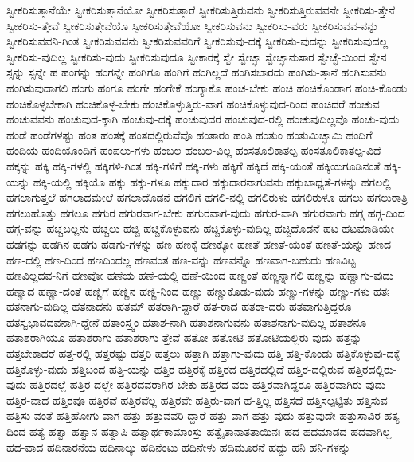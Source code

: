 {ಸ್ವೀಕರಿಸುತ್ತಾನೆಯೇ
ಸ್ವೀಕರಿಸುತ್ತಾನೆಯೋ
ಸ್ವೀಕರಿಸುತ್ತಾರೆ
ಸ್ವೀಕರಿಸುತ್ತಿರುವನು
ಸ್ವೀಕರಿಸುತ್ತಿರುವವನೇ
ಸ್ವೀಕರಿಸು-ತ್ತೇನೆ
ಸ್ವೀಕರಿಸು-ತ್ತೇವೆ
ಸ್ವೀಕರಿಸುತ್ತೇವೆಯೊ
ಸ್ವೀಕರಿಸುತ್ತೇವೆಯೋ
ಸ್ವೀಕರಿಸುವನು
ಸ್ವೀಕರಿಸು-ವರು
ಸ್ವೀಕರಿಸುವವ-ನನ್ನು
ಸ್ವೀಕರಿಸುವವನಿ-ಗಿಂತ
ಸ್ವೀಕರಿಸುವವನು
ಸ್ವೀಕರಿಸುವವರಿಗೆ
ಸ್ವೀಕರಿಸುವು-ದಕ್ಕೆ
ಸ್ವೀಕರಿಸು-ವುದನ್ನು
ಸ್ವೀಕರಿಸುವುದಲ್ಲ
ಸ್ವೀಕರಿಸು-ವುದಿಲ್ಲ
ಸ್ವೀಕರಿಸು-ವುದು
ಸ್ವೀಕರಿಸುವುದೂ
ಸ್ವೀಕಾರಕ್ಕೆ
ಸ್ವೇ
ಸ್ವೇಚ್ಛಾ
ಸ್ವೇಚ್ಛಾನುಸಾರ
ಸ್ವೇಚ್ಛೆ-ಯಿಂದ
ಸ್ವೇನ
ಸ್ಸನ್ನು
ಸ್ಸನ್ನೇ
ಹ
ಹಂಗನ್ನು
ಹಂಗನ್ನೇ
ಹಂಗಿಗೂ
ಹಂಗಿಗೆ
ಹಂಗಿಲ್ಲದೆ
ಹಂಗಿಸಬಾರದು
ಹಂಗಿಸು-ತ್ತಾನೆ
ಹಂಗಿಸುವನು
ಹಂಗಿಸುವುದಾಗಲಿ
ಹಂಗು
ಹಂಗೂ
ಹಂಗೇ
ಹಂಗೇಕೆ
ಹಂಗ್ಯಾಕೊ
ಹಂಚ-ಬೇಕು
ಹಂಚಿ
ಹಂಚಿಕೊಂಡಾಗ
ಹಂಚಿ-ಕೊಂಡು
ಹಂಚಿಕೊಳ್ಳಬೇಕಾಗಿ
ಹಂಚಿಕೊಳ್ಳ-ಬೇಕು
ಹಂಚಿಕೊಳ್ಳುತ್ತಿರು-ವಾಗ
ಹಂಚಿಕೊಳ್ಳುವುದ-ರಿಂದ
ಹಂಚಿದರೆ
ಹಂಚುವ
ಹಂಚುವವನು
ಹಂಚುವುದ-ಕ್ಕಾಗಿ
ಹಂಚುವು-ದಕ್ಕೆ
ಹಂಚುವುದರ
ಹಂಚುವುದ-ರಲ್ಲಿ
ಹಂಚುವುದಿಲ್ಲವೊ
ಹಂಚು-ವುದು
ಹಂಡೆ
ಹಂಡೆಗಳಷ್ಟು
ಹಂತ
ಹಂತಕ್ಕೆ
ಹಂತದಲ್ಲಿರುವೆವೊ
ಹಂತಾರಂ
ಹಂತಿ
ಹಂತುಂ
ಹಂತುಮಿಚ್ಛಾಮಿ
ಹಂದಿಗೆ
ಹಂದಿಯ
ಹಂದಿಯೊಂದಿಗೆ
ಹಂಪಲು-ಗಳು
ಹಂಬಲ
ಹಂಬಲ-ವಿಲ್ಲ
ಹಂಸತೂಲಿಕಾತಲ್ಪ
ಹಂಸತೂಲಿಕಾತಲ್ಪ-ವಿದೆ
ಹಕ್ಕನ್ನು
ಹಕ್ಕಿ
ಹಕ್ಕಿ-ಗಳಲ್ಲಿ
ಹಕ್ಕಿಗಳಿ-ಗಿಂತ
ಹಕ್ಕಿ-ಗಳಿಗೆ
ಹಕ್ಕಿ-ಗಳು
ಹಕ್ಕಿಗೆ
ಹಕ್ಕಿದೆ
ಹಕ್ಕಿ-ಯಂತೆ
ಹಕ್ಕಿಯಗೂಡಿನಂತೆ
ಹಕ್ಕಿ-ಯನ್ನು
ಹಕ್ಕಿ-ಯಲ್ಲಿ
ಹಕ್ಕಿಯೊ
ಹಕ್ಕು
ಹಕ್ಕು-ಗಳೂ
ಹಕ್ಕುದಾರ
ಹಕ್ಕುದಾರನಾಗುವನು
ಹಕ್ಕುಬಾಧ್ಯತೆ-ಗಳನ್ನು
ಹಗಲಲ್ಲಿ
ಹಗಲಾಗುತ್ತಲೆ
ಹಗಲಾದಮೇಲೆ
ಹಗಲಾದೊಡನೆ
ಹಗಲಿಗೆ
ಹಗಲಿ-ನಲ್ಲಿ
ಹಗಲಿರುಳು
ಹಗಲಿರುಳೂ
ಹಗಲು
ಹಗಲುರಾತ್ರಿ
ಹಗಲುಹೊತ್ತು
ಹಗಲೂ
ಹಗುರ
ಹಗುರವಾಗ-ಬೇಕು
ಹಗುರವಾಗ-ವುದು
ಹಗುರ-ವಾಗಿ
ಹಗುರವಾಗು
ಹಗ್ಗ
ಹಗ್ಗ-ದಿಂದ
ಹಗ್ಗ-ವನ್ನು
ಹಚ್ಚಬಲ್ಲನು
ಹಚ್ಚಲು
ಹಚ್ಚಿ
ಹಚ್ಚಿಕೊಳ್ಳುವನು
ಹಚ್ಚಿಕೊಳ್ಳು-ವುದಿಲ್ಲ
ಹಚ್ಚಿದೊಡನೆ
ಹಟ
ಹಟಮಾಡಿಯೇ
ಹಡಗನ್ನು
ಹಡಗಿನ
ಹಡಗು
ಹಡಗು-ಗಳನ್ನು
ಹಣ
ಹಣಕ್ಕೆ
ಹಣಕ್ಕೋ
ಹಣತೆ
ಹಣತೆ-ಯಂತೆ
ಹಣತೆ-ಯನ್ನು
ಹಣದ
ಹಣ-ದಲ್ಲಿ
ಹಣ-ದಿಂದ
ಹಣದಿಂದಲ್ಲ
ಹಣವಂತ
ಹಣ-ವನ್ನು
ಹಣವನ್ನೊ
ಹಣವಾಗ-ಬಹುದು
ಹಣವಿಟ್ಟ
ಹಣವಿಲ್ಲದವ-ನಿಗೆ
ಹಣವೋ
ಹಣೆಯ
ಹಣೆ-ಯಲ್ಲಿ
ಹಣೆ-ಯಿಂದ
ಹಣ್ಣಂತೆ
ಹಣ್ಣನ್ನಾಗಲಿ
ಹಣ್ಣನ್ನು
ಹಣ್ಣಾಗು-ವುದು
ಹಣ್ಣಾದ
ಹಣ್ಣಾ-ದಂತೆ
ಹಣ್ಣಿಗೆ
ಹಣ್ಣಿನ
ಹಣ್ಣಿ-ನಿಂದ
ಹಣ್ಣು
ಹಣ್ಣುಕೊಡು-ವುದು
ಹಣ್ಣು-ಗಳನ್ನು
ಹಣ್ಣು-ಗಳು
ಹತಃ
ಹತನಾಗು-ವುದಿಲ್ಲ
ಹತನಾದನು
ಹತಮ್
ಹತರಾಗಿ-ದ್ದಾರೆ
ಹತ-ರಾದ
ಹತರಾ-ದರು
ಹತವಾಗುತ್ತಿದ್ದರೂ
ಹತಸ್ವಭಾವದವನಾಗಿ-ದ್ದೇನೆ
ಹತಾಂಸ್ತ್ವಂ
ಹತಾಶ-ನಾಗಿ
ಹತಾಶನಾಗುವನು
ಹತಾಶನಾಗು-ವುದಿಲ್ಲ
ಹತಾಶನೂ
ಹತಾಶರಾಗಿಯೂ
ಹತಾಶರಾಗು
ಹತಾಶರಾಗು-ತ್ತೇವೆ
ಹತೋ
ಹತೋಟಿ
ಹತೋಟಿಯಲ್ಲಿರು-ವುದು
ಹತ್ತನ್ನು
ಹತ್ತಬೇಕಾದರೆ
ಹತ್ತ-ರಲ್ಲಿ
ಹತ್ತರಷ್ಟು
ಹತ್ತರಿ
ಹತ್ತಲು
ಹತ್ತಾಗಿ
ಹತ್ತಾಗು-ವುದು
ಹತ್ತಿ
ಹತ್ತಿ-ಕೊಂಡು
ಹತ್ತಿಕೊಳ್ಳುವು-ದಕ್ಕೆ
ಹತ್ತಿಕೊಳ್ಳು-ವುದು
ಹತ್ತಿಬಂದ
ಹತ್ತಿ-ಯನ್ನು
ಹತ್ತಿರ
ಹತ್ತಿರಕ್ಕೆ
ಹತ್ತಿರದ
ಹತ್ತಿರದಲ್ಲಿದೆ
ಹತ್ತಿರ-ದಲ್ಲಿರುವ
ಹತ್ತಿರದಲ್ಲಿರು-ವುದು
ಹತ್ತಿರದಲ್ಲೆ
ಹತ್ತಿರ-ದಲ್ಲೇ
ಹತ್ತಿರದವರಾಗಿರ-ಬೇಕು
ಹತ್ತಿರದ-ವರು
ಹತ್ತಿರವಾಗಿದ್ದರೂ
ಹತ್ತಿರವಾಗಿರು-ವುದು
ಹತ್ತಿರ-ವಾದ
ಹತ್ತಿರವೂ
ಹತ್ತಿರವೆ
ಹತ್ತಿರವೆಲ್ಲ
ಹತ್ತಿರವೇ
ಹತ್ತಿರು-ವಾಗ
ಹ-ತ್ತಿಲ್ಲ
ಹತ್ತಿಸದೆ
ಹತ್ತಿಸಲ್ಪಟ್ಟಿತು
ಹತ್ತಿಸುವ
ಹತ್ತಿಸು-ವಂತೆ
ಹತ್ತಿಹೋಗು-ವಾಗ
ಹತ್ತು
ಹತ್ತುವವರಿ-ದ್ದಾರೆ
ಹತ್ತು-ವಾಗ
ಹತ್ತು-ವುದು
ಹತ್ತುವುದೇ
ಹತ್ತುಸಾವಿರ
ಹತ್ಯ-ದಿಂದ
ಹತ್ಯೆ
ಹತ್ವಾ
ಹತ್ವಾನ
ಹತ್ವಾಪಿ
ಹತ್ವಾರ್ಥಕಾಮಾಂಸ್ತು
ಹತ್ವೈತಾನಾತತಾಯಿನಃ
ಹದ
ಹದಮಾಡದ
ಹದವಾಗಿಲ್ಲ
ಹದ-ವಾದ
ಹದಿನಾರನೆಯ
ಹದಿನಾಲ್ಕು
ಹದಿನೆಂಟು
ಹದಿನೇಳು
ಹದಿಮೂರನೆ
ಹದ್ದು
ಹನಿ
ಹನಿ-ಗಳನ್ನು
}
